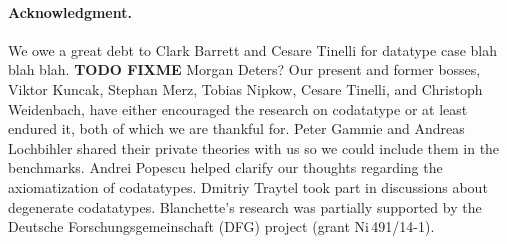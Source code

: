 \def\ackname{Acknowledgment}
\paragraph{\ackname.}
We owe a great debt to Clark Barrett and Cesare Tinelli for datatype case blah
blah blah. \textbf{TODO FIXME}
Morgan Deters?
%
Our present and former bosses, Viktor Kuncak, Stephan Merz, Tobias Nipkow,
Cesare Tinelli, and Christoph Weidenbach, have either encouraged the research on
codatatype or at least endured
it, both of which we are thankful for.
%
Peter Gammie and Andreas Lochbihler shared their private
theories with us so we could include them in the benchmarks.
Andrei Popescu helped clarify our thoughts regarding the axiomatization of
codatatypes. Dmitriy Traytel took part in discussions about degenerate
codatatypes.
%
Blanchette's research was partially supported by the Deutsche
Forschungs\-gemein\-schaft (DFG) project
 (grant Ni\,491\slash 14-1).


{}


